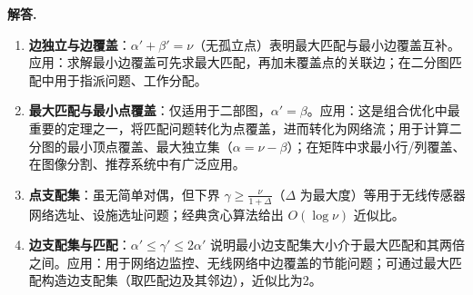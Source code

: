\documentclass[12pt, a4paper, oneside]{ctexart}
\newenvironment{solution}{\par\noindent\textbf{解答. }}{\par}
\begin{document}
\begin{solution}
\begin{enumerate}
    \item \textbf{边独立与边覆盖}：$\alpha' + \beta' = \nu$（无孤立点）表明最大匹配与最小边覆盖互补。应用：求解最小边覆盖可先求最大匹配，再加未覆盖点的关联边；在二分图匹配中用于指派问题、工作分配。

    \item \textbf{最大匹配与最小点覆盖}：仅适用于二部图，$\alpha' = \beta$。应用：这是组合优化中最重要的定理之一，将匹配问题转化为点覆盖，进而转化为网络流；用于计算二分图的最小顶点覆盖、最大独立集（$\alpha = \nu - \beta$）；在矩阵中求最小行/列覆盖、在图像分割、推荐系统中有广泛应用。

    \item \textbf{点支配集}：虽无简单对偶，但下界 $\gamma \ge \frac{\nu}{1+\Delta}$（$\Delta$ 为最大度）等用于无线传感器网络选址、设施选址问题；经典贪心算法给出 $O(\log \nu)$ 近似比。

    \item \textbf{边支配集与匹配}：$\alpha' \le \gamma' \le 2\alpha'$ 说明最小边支配集大小介于最大匹配和其两倍之间。应用：用于网络边监控、无线网络中边覆盖的节能问题；可通过最大匹配构造边支配集（取匹配边及其邻边），近似比为2。

\end{enumerate}


\end{solution}
\end{document}
